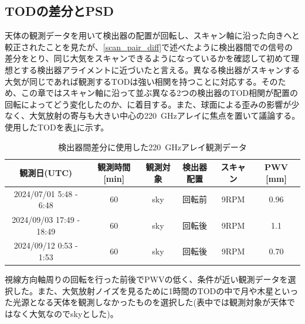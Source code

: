 \subsection{TODの差分とPSD}
天体の観測データを用いて検出器の配置が回転し、スキャン軸に沿った向きへと較正されたことを見たが、\ref{scan_pair_diff}で述べたように検出器間での信号の差分をとり、同じ大気をスキャンできるようになっているかを確認して初めて理想とする検出器アライメントに近づいたと言える。異なる検出器がスキャンする大気が同じであれば観測するTODは強い相関を持つことに対応する。そのため、この章ではスキャン軸に沿って並ぶ異なる2つの検出器のTOD相関が配置の回転によってどう変化したのか、に着目する。また、球面による歪みの影響が少なく、大気放射の寄与も大きい中心の\SI{220}{GHz}アレイに焦点を置いて議論する。使用したTODを表\ref{pair_diff_table}に示す。
\begin{table}[htbp]
  \centering
  \caption{検出器間差分に使用した\SI{220}{GHz}アレイ観測データ}
  \vspace{3mm}
  \begin{tabular}{cccccc} \hline\hline
    観測日(UTC) & 観測時間 [min] & 観測対象 & 検出器配置 & スキャン & PWV [mm]\\ \hline
    2024/07/01 5:48 - 6:48 & 60 & sky & 回転前 & 9RPM & 0.96\\ \hline
    2024/09/03 17:49 - 18:49 & 60 & sky & 回転後 & 9RPM & 1.1 \\
    2024/09/12 0:53 - 1:53 & 60 & sky & 回転後 & 9RPM & 0.70 \\ \hline\hline

  \end{tabular}
  \label{pair_diff_table}
\end{table}
視線方向軸周りの回転を行った前後でPWVの低く、条件が近い観測データを選択した。また、大気放射ノイズを見るために1時間のTODの中で月や木星といった光源となる天体を観測しなかったものを選択した(表中では観測対象が天体ではなく大気なのでskyとした)。

